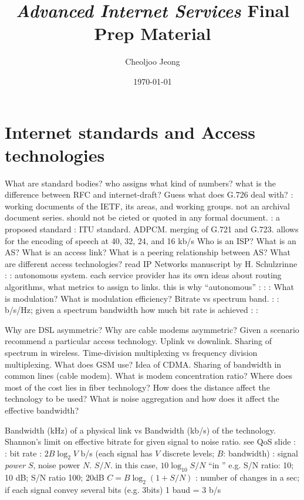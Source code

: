 \documentclass{myart}
\begin{document}
\small
\title{\large {\sl Advanced Internet Services\/} Final Prep Material}
\author{\normalsize Cheoljoo Jeong}
\date{\normalsize\today}
\maketitle


\section*{Internet standards and Access technologies}
\ben
\w What are standard bodies? who assigns what kind of numbers? what
is the difference between RFC and internet-draft? Guess what does
G.726 deal with?
	\bit
	\w {}: working documents of the IETF, its areas, and
		working groups. not an archival document series. should not
		be cieted or quoted in any formal document.
	\w {}: a proposed standard
	\w {}: ITU standard. ADPCM. 
		merging of G.721 and G.723. allows for the encoding
		of speech at 40, 32, 24, and 16 kb/s
	\eit
\w Who is an ISP? What is an AS? What is an access link? What is a
peering relationship between AS? What are different access technologies?
	\bit
	\w read IP Networks manuscript by H. Schulzrinne
	\w {}:
	\w {}: autonomous system.  each service provider has its
	own ideas about routing algorithms, what metrics to assign to
	links. this is why ``autonomous''
	\w {}:
	\w {}:
	\w {}:
	\eit
\w What is modulation? What is modulation efficiency? Bitrate vs
spectrum band.
	\bit
	\w {}:
	\w {}: b/s/Hz; given a spectrum bandwidth
		how much bit rate is achieved
	\w {}:
	\w {}:
	\eit

\w Why are DSL asymmetric? Why are cable modems asymmetric? Given a
scenario recommend a particular access technology. Uplink vs
downlink. Sharing of spectrum in wireless. Time-division multiplexing
vs frequency division multiplexing. What does GSM use? Idea of CDMA.
Sharing of bandwidth in common lines (cable modem). What is modem
concentration ratio? Where does most of the cost lies in fiber
technology? How does the distance affect the technology to be used?
What is noise aggregation and how does it affect the effective
bandwidth?

\w Bandwidth (kHz) of a physical link vs Bandwidth (kb/s) of the
technology.  Shannon's limit on effective bitrate for given signal to
noise ratio.
	\bit
	\w see QoS slide
	\w {}:
	\w {}: bit rate
	\w {}: $2B\log_2 V$ b/s
		(each signal has $V$ discrete levels; 
		$B$: bandwidth)
	: signal {\em power\/} $S$, 
	noise power
	$N$. $S/N$. in this case, $10 \log_{10} S/N$ ``in ''
	\bit
	\w e.g. S/N ratio: 10; 10 dB; S/N ratio 100; 20dB
	\eit
	\w $C = B \log_2 (1 + S/N)$
	\w {}: number of changes in a sec; if each signal convey
		several bits (e.g. 3bits) 1 baud = 3 b/s
	\eit
\een
\end{document}
